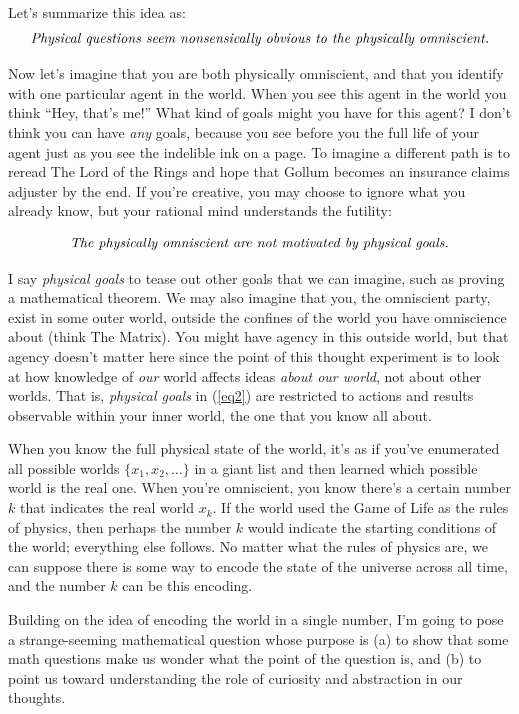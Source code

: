 \documentclass[9pt, twoside]{book}
\theoremstyle{argtstyle}
\begin{document}
Let's summarize this idea as:
\begin{equation*}\label{eq1}
    \text{\em Physical questions seem nonsensically obvious to the physically
    omniscient.}
\end{equation*}

Now let's imagine that you are both physically omniscient, and that you identify
with one particular agent in the world.
When you see this agent in the world you
think ``Hey, that's me!'' What kind of goals might you have for this agent? I
don't think you can have {\em any} goals, because you see before you the
full life of your agent just as you see the indelible ink on a page. To imagine
a different path is to reread The Lord of the Rings and hope that Gollum
becomes an insurance claims adjuster by the end. If you're creative, you may
choose to ignore what you already know, but your rational mind understands the
futility:

\begin{equation}\label{eq2}
    \text{\em The physically omniscient are not motivated by
    physical goals.}
\end{equation}
 
I say {\em physical goals} to tease out other goals that we can imagine, such as
proving a mathematical theorem. We may also imagine that you, the omniscient
party, exist in some outer world, outside the confines of the world you have
omniscience about (think The Matrix).
You might have agency in this outside world, but that agency doesn't matter here
since the point of this thought
experiment is to look at how knowledge of {\em our} world affects ideas {\em
about our world}, not about other worlds.
That is, {\em physical goals} in (\ref{eq2})
are restricted to actions and results observable
within your inner world, the one that you know all about.

When you know the full physical state of the world, it's as if you've
enumerated
all possible worlds $\{x_1, x_2, \ldots\}$ in a giant list and
then learned which possible world is the real one. When you're omniscient, you
know there's a certain number $k$ that indicates the real world $x_k$.
If the world used the Game of Life as the rules of physics, then perhaps the
number $k$ would indicate the starting conditions of the world; everything else
follows. No matter what the rules of physics are, we can suppose there is some
way to encode the state of the universe across all time, and the number
$k$ can be this encoding.

Building on the idea of encoding the world in a single number,
I'm going to pose a strange-seeming mathematical question whose purpose is
(a) to show that some math questions make us wonder what the
point of the question is, and (b) to point us toward understanding the role of
curiosity and abstraction in our thoughts.
\end{document}
